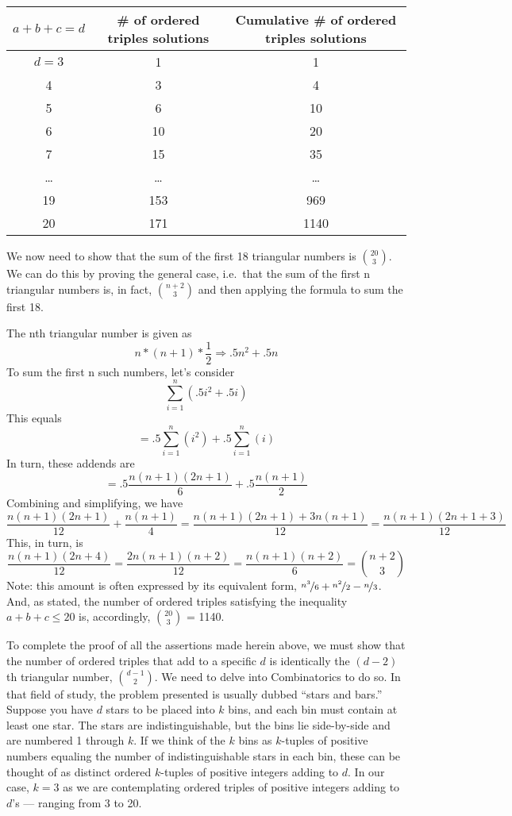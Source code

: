 \begin{center}
\begin{tabular}{c c c}
\toprule
\(a + b + c = d\) & \# of ordered triples solutions & Cumulative \# of ordered triples solutions \\
\midrule
\(d = 3\) & 1 & 1 \\
4 & 3 & 4 \\
5 & 6 & 10 \\
6 & 10 & 20 \\
7 & 15 & 35 \\
\ldots & \ldots & \ldots \\
19 & 153 & 969 \\
20 & 171 & 1140 \\
\bottomrule
\end{tabular}
\end{center}

We now need to show that the sum of the first 18 triangular numbers is \(\binom{20}{3}\). We can do this by proving the general case, i.e.\ that the sum of the first n triangular numbers is, in fact, \(\binom{n+2}{3}\) and then applying the formula to sum the first 18.

The nth triangular number is given as
\[n * (n+1) * \frac{1}{2} \Rightarrow .5n^2 + .5n\]
To sum the first n such numbers, let’s consider
\[\sum_{i=1}^{n}(.5i^2 + .5i)\]
This equals
\[= .5\sum_{i=1}^{n}(i^2) + .5\sum_{i=1}^{n}(i)\]
In turn, these addends are
\[= .5\frac{n(n + 1)(2n + 1)}{6} + .5\frac{n(n + 1)}{2}\]
Combining and simplifying, we have
\[\frac{n(n+1)(2n+1)}{12} + \frac{n(n+1)}{4} = \frac{n(n+1)(2n+1)+3n(n+1)}{12} = \frac{n(n+1)(2n+1+3)}{12}\]
This, in turn, is
\[\frac{n(n+1)(2n+4)}{12} = \frac{2n(n+1)(n+2)}{12} = \frac{n(n+1)(n+2)}{6} = \binom{n+2}{3}\]
Note: this amount is often expressed by its equivalent form, \(\nicefrac{n^3}{6} + \nicefrac{n^2}{2} - \nicefrac{n}{3}\). And, as stated, the number of ordered triples satisfying the inequality \(a + b + c \leq 20\) is, accordingly, \(\binom{20}{3}\) = 1140. 

To complete the proof of all the assertions made herein above, we must show that the number of ordered triples that add to a specific \(d\) is identically the \((d - 2)\)th triangular number, \(\binom{d-1}{2}\). We need to delve into Combinatorics to do so. In that field of study, the problem presented is usually dubbed “stars and bars.” Suppose you have \(d\) stars to be placed into \(k\) bins, and each bin must contain at least one star. The stars are indistinguishable, but the bins lie side-by-side and are numbered 1 through \(k\). If we think of the \(k\) bins as \(k\)-tuples of positive numbers equaling the number of indistinguishable stars in each bin, these can be thought of as distinct ordered \(k\)-tuples of positive integers adding to \(d\). In our case, \(k = 3\) as we are contemplating ordered triples of positive integers adding to \(d\)’s --- ranging from 3 to 20.

